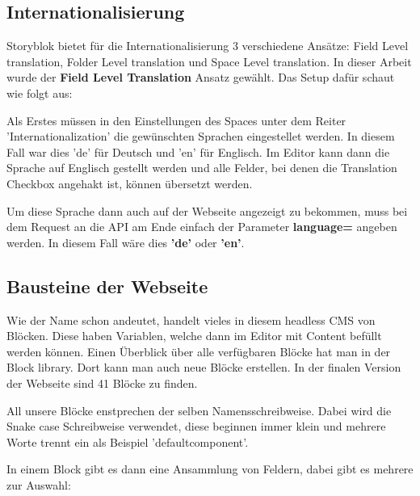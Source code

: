 \subsection{Internationalisierung}
Storyblok bietet für die Internationalisierung 3 verschiedene Ansätze: Field Level translation, Folder Level translation und Space Level translation. 
In dieser Arbeit wurde der \textbf{Field Level Translation} Ansatz gewählt. 
Das Setup dafür schaut wie folgt aus:

Als Erstes müssen in den Einstellungen des Spaces unter dem Reiter 'Internationalization' die gewünschten Sprachen eingestellet werden. 
In diesem Fall war dies 'de' für Deutsch und 'en' für Englisch. 
Im Editor kann dann die Sprache auf Englisch gestellt werden und alle Felder, bei denen die Translation Checkbox angehakt ist, können übersetzt werden. 

Um diese Sprache dann auch auf der Webseite angezeigt zu bekommen, muss bei dem Request an die API am Ende einfach der Parameter \textbf{language=} angeben werden. 
In diesem Fall wäre dies \textbf{'de'} oder \textbf{'en'}.


\subsection{Bausteine der Webseite}
Wie der Name schon andeutet, handelt vieles in diesem headless CMS von Blöcken. Diese haben Variablen, welche dann im Editor mit Content befüllt werden können. 
Einen Überblick über alle verfügbaren Blöcke hat man in der Block library. Dort kann man auch neue Blöcke erstellen. In der finalen Version der Webseite sind 41 Blöcke zu finden. 

All unsere Blöcke enstprechen der selben Namensschreibweise. Dabei wird die Snake case Schreibweise verwendet, diese beginnen immer klein und mehrere Worte trennt ein \textunderscore  als Beispiel 'default\textunderscore component'.

In einem Block gibt es dann eine Ansammlung von Feldern, dabei gibt es mehrere zur Auswahl:


